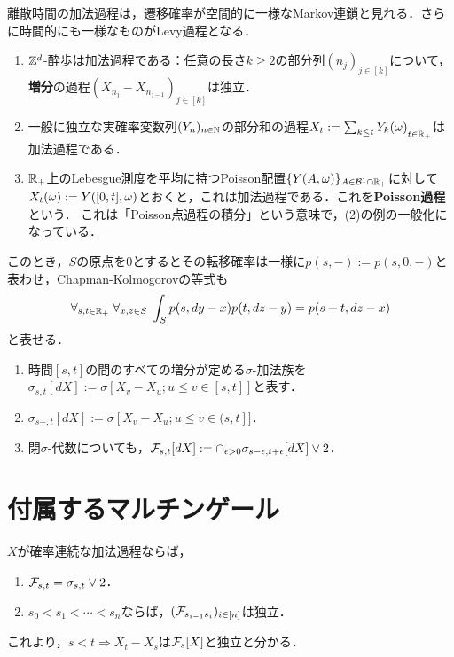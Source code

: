 \documentclass[uplatex,dvipdfmx]{jsreport}
\begin{document}
\begin{example}
    離散時間の加法過程は，遷移確率が空間的に一様なMarkov連鎖と見れる．さらに時間的にも一様なものがLevy過程となる．
    \begin{enumerate}
        \item $\mathbb{Z}^d$-酔歩は加法過程である：任意の長さ$k\ge2$の部分列$(n_j)_{j\in[k]}$について，\textbf{増分}の過程$(X_{n_j}-X_{n_{j-1}})_{j\in[k]}$は独立．
        \item 一般に独立な実確率変数列$(Y_n)_{n\in\mathbb{N}}$の部分和の過程${X_t:=\sum_{k\le t}Y_k(\omega)}_{t\in\mathbb{R}_+}$は加法過程である．
        \item $\mathbb{R}_+$上のLebesgue測度を平均に持つPoisson配置$\{Y(A,\omega)\}_{A\in\mathcal{B}^1\cap\mathbb{R}_+}$に対して$X_t(\omega):=Y([0,t],\omega)$とおくと，これは加法過程である．これを\textbf{Poisson過程}という．
        これは「Poisson点過程の積分」という意味で，(2)の例の一般化になっている．
    \end{enumerate}
\end{example}

\begin{remark}
    このとき，$S$の原点を$0$とするとその転移確率は一様に$p(s,-):=p(s,0,-)$と表わせ，Chapman-Kolmogorovの等式も
    \[\forall_{s,t\in\mathbb{R}_+}\;\forall_{x,z\in S}\;\int_Sp(s,dy-x)p(t,dz-y)=p(s+t,dz-x)\]
    と表せる．
\end{remark}

\begin{notation}\mbox{}
    \begin{enumerate}
        \item 時間$[s,t]$の間のすべての増分が定める$\sigma$-加法族を$\sigma_{s,t}[dX]:=\sigma[X_v-X_u;u\le v\in[s,t]]$と表す．
        \item $\sigma_{s+,t}[dX]:=\sigma[X_v-X_u;u\le v\in(s,t]]$．
        \item 閉$\sigma$-代数についても，$\mathcal{F}_{s,t}[dX]:=\cap_{\epsilon>0}\sigma_{s-\epsilon,t+\epsilon}[dX]\lor 2$．
    \end{enumerate}
\end{notation}

\section{付属するマルチンゲール}

\begin{theorem}
    $X$が確率連続な加法過程ならば，
    \begin{enumerate}
        \item $\mathcal{F}_{s,t}=\sigma_{s,t}\lor 2$．
        \item $s_0<s_1<\cdots<s_n$ならば，$(\mathcal{F}_{s_{i-1}s_i})_{i\in[n]}$は独立．
    \end{enumerate}
\end{theorem}
\begin{remarks}
    これより，$s<t\Rightarrow X_t-X_s$は$\mathcal{F}_s[X]$と独立と分かる．
\end{remarks}
\end{document}
